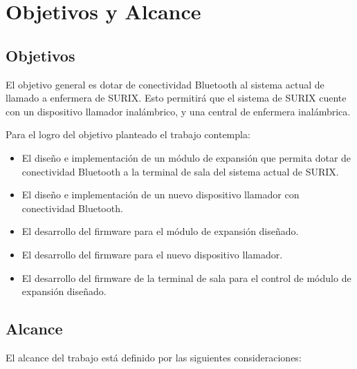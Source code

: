 
\section{Objetivos y Alcance}

\subsection{Objetivos}

El objetivo general es dotar de conectividad Bluetooth al sistema actual de llamado a enfermera de SURIX. Esto permitirá que el sistema de SURIX cuente con un dispositivo llamador inalámbrico, y una central de enfermera inalámbrica.

Para el logro del objetivo planteado el trabajo contempla:

\begin{itemize}

\item El diseño e implementación de un módulo de expansión que permita dotar de conectividad Bluetooth a la terminal de sala del sistema actual de SURIX.

\item El diseño e implementación de un nuevo dispositivo llamador con conectividad Bluetooth.

\item El desarrollo del firmware para el módulo de expansión diseñado.

\item El desarrollo del firmware para el nuevo dispositivo llamador.

\item El desarrollo del firmware de la terminal de sala para el control de módulo de expansión diseñado.

\end{itemize}

\subsection{Alcance}

El alcance del trabajo está definido por las siguientes consideraciones:


